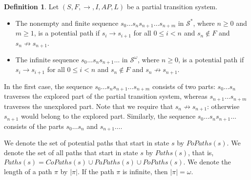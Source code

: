\documentclass[12pt]{article}
\theoremstyle{definition}
\newtheorem{definition}{Definition}
\begin{document}
\begin{definition}
Let $(S, F, \rightarrow, I, \mathit{AP}, L)$ be a partial transition system.
\begin{itemize}
\item 
The nonempty and finite sequence $s_0 \ldots s_n s_{n+1} \ldots s_{n+m}$ in $\mathcal{S}^*$, where $n \geq 0$ and $m \geq 1$, is a potential path if $s_i \rightarrow s_{i+1}$ for all $0 \leq i < n$ and $s_n \not\in F$ and $s_n \not\rightarrow s_{n+1}$.
\item 
The infinite sequence $s_0 \ldots s_n s_{n+1} \ldots$ in $\mathcal{S}^{\omega}$, where $n \geq 0$, is a potential path if $s_i \rightarrow s_{i+1}$ for all $0 \leq i < n$ and $s_n \not\in F$ and $s_n \not\rightarrow s_{n+1}$.
\end{itemize}
\end{definition}

In the first case, the sequence $s_0 \ldots s_n s_{n+1} \ldots s_{n+m}$ consists of two parts: $s_0 \ldots s_n$ traverses the explored part of the partial transition system, whereas $s_{n+1} \ldots s_{n+m}$ traverses the unexplored part.  Note that we require that $s_n \not\rightarrow s_{n+1}$: otherwise $s_{n+1}$ would belong to the explored part.  Similarly, the sequence $s_0 \ldots s_n s_{n+1} \ldots$ consists of the parts $s_0 \ldots s_n$ and $s_{n+1} \ldots$.  

We denote the set of potential paths that start in state $s$ by $\mathit{PoPaths}(s)$.  We denote the set of all paths that start in state $s$ by $\mathit{Paths}(s)$, that is, $\mathit{Paths}(s) = \mathit{CoPaths}(s) \cup \mathit{PaPaths}(s) \cup \mathit{PoPaths}(s)$.  We denote the length of a path $\pi$ by $|\pi|$.  If the path $\pi$ is infinite, then $|\pi| = \omega$.
\end{document}
